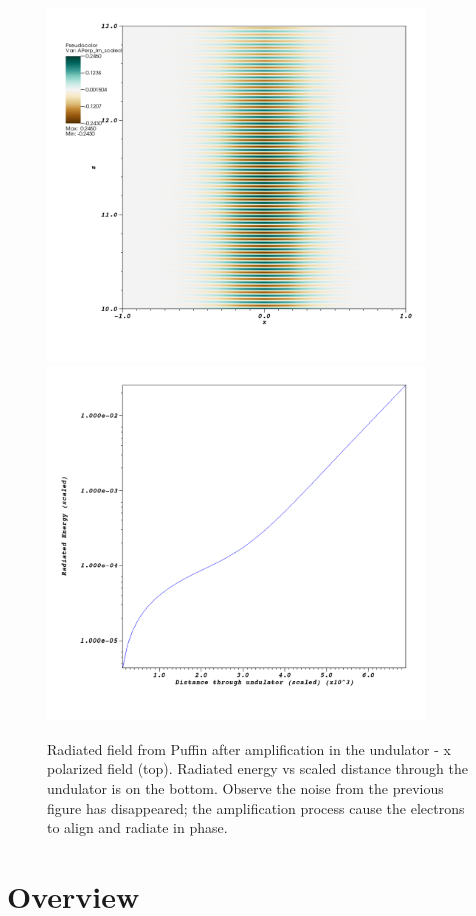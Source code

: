 \documentclass[12pt]{article}%
\begin{document}
\begin{figure}
\centering
\includegraphics[width=100mm]{visit0036.png}
\includegraphics[width=100mm]{visit0037.png}
\caption{Radiated field from Puffin after amplification in the undulator - x polarized field (top). Radiated energy vs scaled distance through the undulator is on the bottom. Observe the noise from the previous figure has disappeared; the amplification process cause the electrons to align and radiate in phase.  }
\label{bbd2}
\end{figure}

\newpage

\section{Overview}
\end{document}
